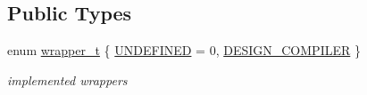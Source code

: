 \subsection*{Public Types}
\begin{DoxyCompactItemize}
\item 
enum \hyperlink{classSynopsysWrapper_aab689f1a6257beb3a60b6e3df4a718c6}{wrapper\+\_\+t} \{ \hyperlink{classSynopsysWrapper_aab689f1a6257beb3a60b6e3df4a718c6ae90eb195da57dfe103b0e6f9cb2eb22e}{U\+N\+D\+E\+F\+I\+N\+ED} = 0, 
\hyperlink{classSynopsysWrapper_aab689f1a6257beb3a60b6e3df4a718c6a93cd638ff29cac0d103e9e402be61798}{D\+E\+S\+I\+G\+N\+\_\+\+C\+O\+M\+P\+I\+L\+ER}
 \}\begin{DoxyCompactList}\small\item\em implemented wrappers \end{DoxyCompactList}
\end{DoxyCompactItemize}
